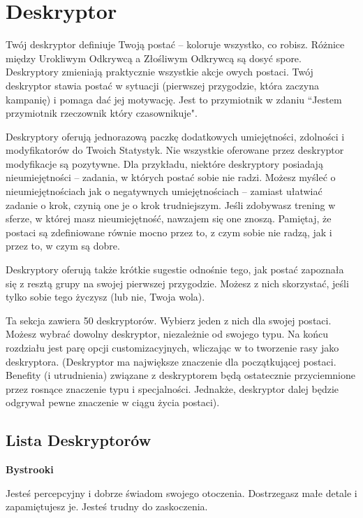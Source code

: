 \section{Deskryptor}

Twój deskryptor definiuje Twoją postać – koloruje wszystko, co robisz. Różnice między Urokliwym Odkrywcą a Złośliwym Odkrywcą są dosyć spore. Deskryptory zmieniają praktycznie wszystkie akcje owych postaci. Twój deskryptor stawia postać w sytuacji (pierwszej przygodzie, która zaczyna kampanię) i pomaga dać jej motywację. Jest to przymiotnik w zdaniu “Jestem przymiotnik rzeczownik który czasownikuje". 

Deskryptory oferują jednorazową paczkę dodatkowych umiejętności, zdolności i modyfikatorów do Twoich Statystyk. Nie wszystkie oferowane przez deskryptor modyfikacje są pozytywne. Dla przykładu, niektóre deskryptory posiadają nieumiejętności – zadania, w których postać sobie nie radzi. Możesz myśleć o nieumiejętnościach jak o negatywnych umiejętnościach – zamiast ułatwiać zadanie o krok, czynią one je o krok trudniejszym. Jeśli zdobywasz trening w sferze, w której masz nieumiejętność, nawzajem się one znoszą. Pamiętaj, że postaci są zdefiniowane równie mocno przez to, z czym sobie nie radzą, jak i przez to, w czym są dobre. 

Deskryptory oferują także krótkie sugestie odnośnie tego, jak postać zapoznała się z resztą grupy na swojej pierwszej przygodzie. Możesz z nich skorzystać, jeśli tylko sobie tego życzysz (lub nie, Twoja wola).

Ta sekcja zawiera 50 deskryptorów. Wybierz jeden z nich dla swojej postaci. Możesz wybrać dowolny deskryptor, niezależnie od swojego typu. Na końcu rozdziału jest parę opcji customizacyjnych, wliczając w to tworzenie rasy jako deskryptora.
(Deskryptor ma największe znaczenie dla początkującej postaci. Benefity (i utrudnienia) związane z deskryptorem będą ostatecznie przyciemnione przez rosnące znaczenie typu i specjalności. Jednakże, deskryptor dalej będzie odgrywał pewne znaczenie w ciągu życia postaci). 

\subsection{Lista Deskryptorów}

\textbf{Bystrooki}

Jesteś percepcyjny i dobrze świadom swojego otoczenia. Dostrzegasz małe detale i zapamiętujesz je. Jesteś trudny do zaskoczenia.


